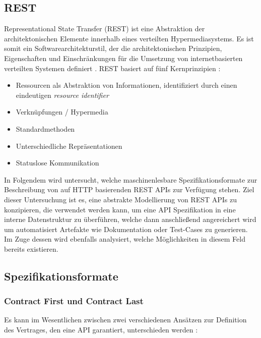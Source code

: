 \subsection{REST}

Representational State Transfer (REST) ist eine Abstraktion der architektonischen Elemente innerhalb eines verteilten Hypermediasystems. Es ist somit ein Softwarearchitekturstil, der die architektonischen Prinzipien, Eigenschaften und Einschränkungen für die Umsetzung von internetbasierten verteilten Systemen definiert \parencite[86]{fielding2000architectural}. REST basiert auf fünf Kernprinzipien \parencite[11]{tilkov2015rest}:
\begin{itemize}
	\item Ressourcen als Abstraktion von Informationen, identifiziert durch einen eindeutigen \emph{resource identifier}
	\item Verknüpfungen / Hypermedia
	\item Standardmethoden
	\item Unterschiedliche Repräsentationen
	\item Statuslose Kommunikation
\end{itemize}

In Folgendem wird untersucht, welche maschinenlesbare Spezifikationsformate zur Beschreibung von auf HTTP basierenden REST APIs zur Verfügung stehen. Ziel dieser Untersuchung ist es, eine abstrakte Modellierung von REST APIs zu konzipieren, die verwendet werden kann, um eine API Spezifikation in eine interne Datenstruktur zu überführen, welche dann anschließend angereichert wird um automatisiert Artefakte wie Dokumentation oder Test-Cases zu generieren. Im Zuge dessen wird ebenfalls analysiert, welche Möglichkeiten in diesem Feld bereits existieren.

\subsection{Spezifikationsformate}

\subsubsection{Contract First und Contract Last}

Es kann im Wesentlichen zwischen zwei verschiedenen Ansätzen zur Definition des Vertrages, den eine API garantiert, unterschieden werden \parencite[272]{spichale2017api}:

